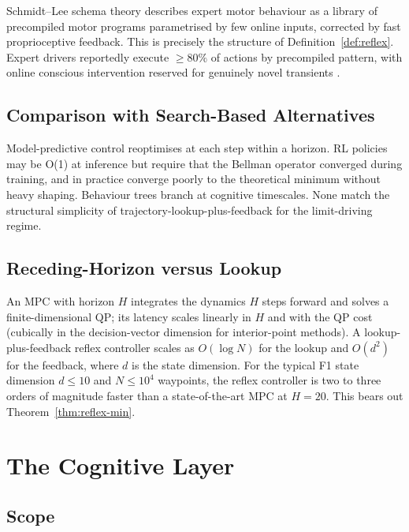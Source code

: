 \documentclass[11pt,twocolumn]{article}
\theoremstyle{definition}
\theoremstyle{remark}
\begin{document}
Schmidt--Lee schema theory \cite{schmidt2019motor,willingham1998motor,doyon2005reorganization} describes expert motor behaviour as a library of precompiled motor programs parametrised by few online inputs, corrected by fast proprioceptive feedback. This is precisely the structure of Definition~\ref{def:reflex}. Expert drivers reportedly execute $\ge 80\%$ of actions by precompiled pattern, with online conscious intervention reserved for genuinely novel transients \cite{willingham1998motor}.

\subsection{Comparison with Search-Based Alternatives}

Model-predictive control \cite{kelly2008controlvehicle,liniger2015optimization,rosolia2019learning} reoptimises at each step within a horizon. RL policies \cite{mnih2015human,kendall2019learning,bellemare2013arcade} may be O(1) at inference but require that the Bellman operator converged during training, and in practice converge poorly to the theoretical minimum without heavy shaping. Behaviour trees \cite{colledanchise2018behavior} branch at cognitive timescales. None match the structural simplicity of trajectory-lookup-plus-feedback for the limit-driving regime.

\subsection{Receding-Horizon versus Lookup}

An MPC with horizon $H$ integrates the dynamics $H$ steps forward and solves a finite-dimensional QP; its latency scales linearly in $H$ and with the QP cost (cubically in the decision-vector dimension for interior-point methods). A lookup-plus-feedback reflex controller scales as $O(\log N)$ for the lookup and $O(d^2)$ for the feedback, where $d$ is the state dimension. For the typical F1 state dimension $d \le 10$ and $N \le 10^4$ waypoints, the reflex controller is two to three orders of magnitude faster than a state-of-the-art MPC at $H = 20$. This bears out Theorem~\ref{thm:reflex-min}.

\section{The Cognitive Layer}
\label{sec:cognitive}

\subsection{Scope}
\end{document}
